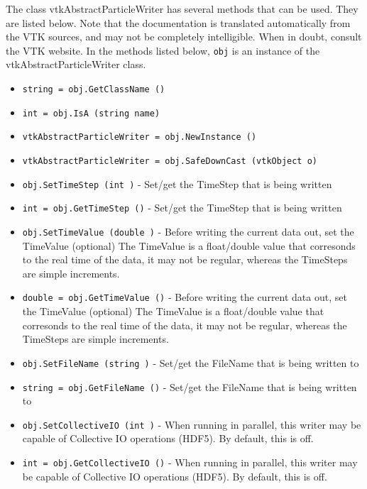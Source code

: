 The class vtkAbstractParticleWriter has several methods that can be used.
  They are listed below.
Note that the documentation is translated automatically from the VTK sources,
and may not be completely intelligible.  When in doubt, consult the VTK website.
In the methods listed below, \verb|obj| is an instance of the vtkAbstractParticleWriter class.
\begin{itemize}
\item  \verb|string = obj.GetClassName ()|

\item  \verb|int = obj.IsA (string name)|

\item  \verb|vtkAbstractParticleWriter = obj.NewInstance ()|

\item  \verb|vtkAbstractParticleWriter = obj.SafeDownCast (vtkObject o)|

\item  \verb|obj.SetTimeStep (int )| -  Set/get the TimeStep that is being written

\item  \verb|int = obj.GetTimeStep ()| -  Set/get the TimeStep that is being written

\item  \verb|obj.SetTimeValue (double )| -  Before writing the current data out, set the TimeValue (optional)
 The TimeValue is a float/double value that corresonds to the real
 time of the data, it may not be regular, whereas the TimeSteps 
 are simple increments.

\item  \verb|double = obj.GetTimeValue ()| -  Before writing the current data out, set the TimeValue (optional)
 The TimeValue is a float/double value that corresonds to the real
 time of the data, it may not be regular, whereas the TimeSteps 
 are simple increments.

\item  \verb|obj.SetFileName (string )| -  Set/get the FileName that is being written to

\item  \verb|string = obj.GetFileName ()| -  Set/get the FileName that is being written to

\item  \verb|obj.SetCollectiveIO (int )| -  When running in parallel, this writer may be capable of 
 Collective IO operations (HDF5). By default, this is off.

\item  \verb|int = obj.GetCollectiveIO ()| -  When running in parallel, this writer may be capable of 
 Collective IO operations (HDF5). By default, this is off.


\end{itemize}
